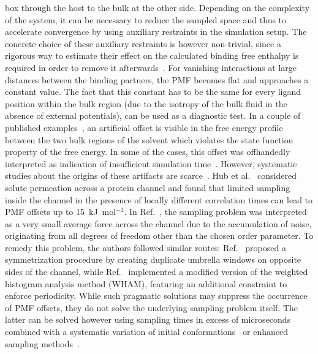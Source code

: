 \documentclass[9pt,lessons,pubversion]{livecoms}
\begin{document}
box through the host to the bulk at the other side.
Depending on the complexity of the system, it can be necessary to reduce the sampled space and thus to accelerate convergence by using auxiliary restraints in the simulation setup.
The concrete choice of these auxiliary restraints is however non-trivial, since a rigorous way to estimate their effect on the calculated binding free enthalpy is required in order to remove it afterwards~\cite{woo2005calculation, boresch2003absolute}.
For vanishing interactions at large distances between the binding partners, the PMF becomes flat and approaches a constant value.
The fact that this constant has to be the same for every ligand position within the bulk region (due to the isotropy of the bulk fluid in the absence of external potentials), can be used as a diagnostic test.
In a couple of published examples~\cite{filippini2012energetic, filippini2012association, allen2006ion, allen2006molecular, bacstuug2008potential, hub2010g_wham, kruger2009potential}, an artificial offset is visible in the free energy profile between the two bulk regions of the solvent which violates the state function property of the free energy.
In some of the cases, this offset was offhandedly interpreted as indication of insufficient simulation time~\cite{bacstuug2008potential}.
However, systematic studies about the origins of these artifacts are scarce~\cite{velez2013overcoming}. 
Hub et al.~\cite{hub2010g_wham} considered solute permeation across a protein channel and found that limited sampling inside the channel in the presence of locally different correlation times can lead to PMF offsets up to 15~kJ~mol$^{-1}$.
In Ref.~, the sampling problem was interpreted as a very small average force across the channel due to the accumulation of noise, originating from all degrees of freedom other than the chosen order parameter.
To remedy this problem, the authors followed similar routes: 
Ref.~ proposed a symmetrization procedure by creating duplicate umbrella windows on opposite sides of the channel, while Ref.~ implemented a modified version of the weighted histogram analysis method (WHAM), featuring an additional constraint to enforce periodicity.
While such pragmatic solutions may suppress the occurrence of PMF offsets, they do not solve the underlying sampling problem itself.
The latter can be solved however using sampling times in excess of microseconds combined with a systematic variation of initial conformations~\cite{neale2014indolicidin} or enhanced sampling methods~\cite{sun2018molecular}.
\end{document}

